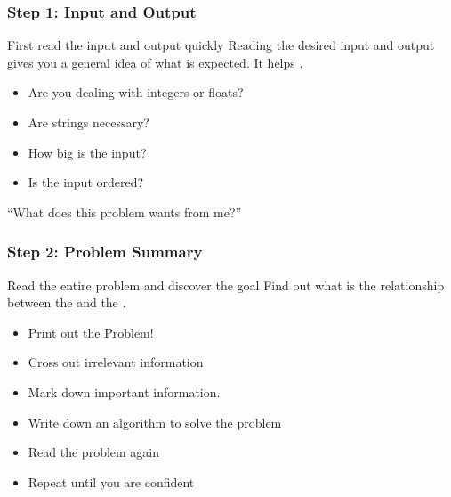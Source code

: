 \documentclass{beamer}
\begin{document}
\begin{frame}
  \frametitle{Step 1: Input and Output}

  \begin{block}{First read the input and output quickly}
    Reading the desired input and output gives you a general idea of
    what is expected. It helps .
  \end{block}
  
  \medskip
  
  \begin{itemize}
  \item Are you dealing with integers or floats?
  \item Are strings necessary?
  \item How big is the input?
  \item Is the input ordered?
  \end{itemize}
  
  \begin{block}{}
    ``What does this problem wants from me?''
  \end{block}
\end{frame}

\begin{frame}
  \frametitle{Step 2: Problem Summary}
  
  \begin{block}{Read the entire problem and discover the goal}
    Find out what is the relationship between the 
    and the .
  \end{block}
  \begin{itemize}
  \item Print out the Problem!
  \item Cross out \alert{irrelevant information}
  \item \alert{Mark down} important information.

    \bigskip
    
  \item Write down an algorithm to solve the problem
  \item Read the problem again
  \item Repeat until you are confident
  \end{itemize}
\end{frame}
\end{document}
